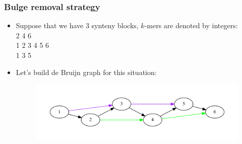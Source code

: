 \documentclass[svgnames,14pt]{beamer}
\begin{document}
\begin{frame}
\frametitle{Bulge removal strategy}
\begin{itemize}
\item Suppose that we have 3 synteny blocks, \(k\)-mers are denoted by integers: \\
2 4 6 \\
1 2 3 4 5 6 \\
1 3 5 \\
\item Let's build de Bruijn graph for this situation:
\begin{changemargin}{-1.cm}{-1.cm}
\begin{figure}
\centering
\includegraphics[scale = 0.50]{graph1.pdf}
\end{figure}
\end{changemargin}
\end{itemize}
\end{frame}
\end{document}
